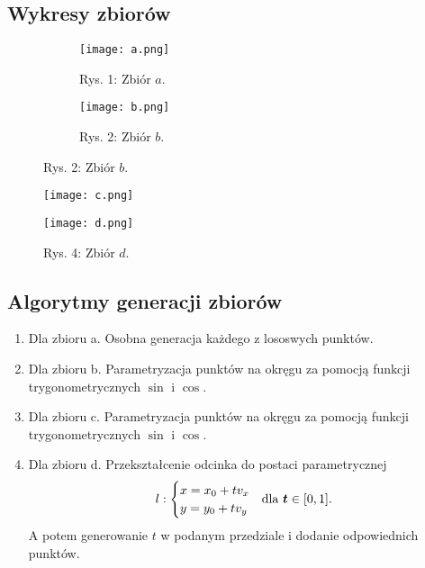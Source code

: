 \subsection{Wykresy zbiorów}
\begin{figure}[!h]
    \centering
    \begin{subfigure}{.5\textwidth}
      \centering
      \texttt{[image: a.png]}
      \caption*{Rys. 1: Zbiór $a$.}
      \label{fig:sub1}
    \end{subfigure}%
    \begin{subfigure}{.5\textwidth}
      \centering
      \texttt{[image: b.png]}
      \caption*{Rys. 2: Zbiór $b$.}
      \label{fig:sub2}
    \end{subfigure}
    \label{fig:test}
    \end{figure}
    \begin{figure}[!h]
    \centering
    \begin{minipage}{.5\textwidth}
      \centering
      \texttt{[image: c.png]}
      \caption*{Rys. 3: Zbiór $c$.}
      \label{fig:test1}
    \end{minipage}%
    \begin{minipage}{.5\textwidth}
      \centering
      \texttt{[image: d.png]}
      \caption*{Rys. 4: Zbiór $d$.}
      \label{fig:test2}
    \end{minipage}
    \end{figure}
\null
    \subsection{Algorytmy generacji zbiorów}
    \begin{enumerate}
    \item Dla zbioru a. Osobna generacja każdego z lososwych punktów.
    \item Dla zbioru b. Parametryzacja punktów na okręgu za pomocją funkcji trygonometrycznych $\sin$ i $\cos$.
    \item Dla zbioru c. Parametryzacja punktów na okręgu za pomocją funkcji trygonometrycznych $\sin$ i $\cos$.
    \item Dla zbioru d. Przekształcenie odcinka do postaci parametrycznej 
    $$
    l:\begin{cases}
      x = x_0 + tv_x& \smash{\raisebox{-1.6ex}{dla $\boldsymbol t \in [0,1]$.}}\\
      y = y_0 + tv_y
    \end{cases}
    $$
    A potem generowanie $t$ w podanym przedziale i dodanie odpowiednich punktów.
    \end{enumerate}
